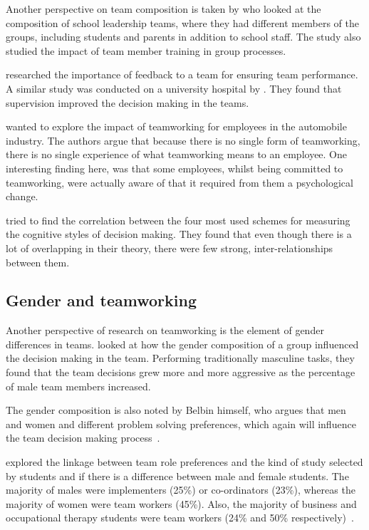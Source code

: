 \documentclass[a4paper,12pt,titlepage]{report}
\begin{document}
  Another perspective on team composition is taken by \citet{jcscjb}
  who looked at the composition of school leadership teams, where they had different
  members of the groups, including students and parents in addition to school staff.
  The study also studied the impact of team member training in group processes.

  \citet{jhdi} researched the importance of feedback to a team for ensuring
  team performance. A similar study was conducted on a university hospital by
  \citet{khka}. They found that supervision improved the decision making in
  the teams.

  \citet{dkdm} wanted to explore the impact of teamworking for employees in
  the automobile industry. The authors argue that because there is no single form of
  teamworking, there is no single experience of what teamworking means to an employee.
  One interesting finding here, was that some employees,
  whilst being committed to teamworking, were actually aware of
  that it required from them a psychological change.

  \citet{nlrskk} tried to find the correlation between the four most used
  schemes for measuring the cognitive styles of decision making. They found that
  even though there is a lot of overlapping in their theory, there were few strong,
  inter-relationships between them.
  
  \subsection{Gender and teamworking}
  Another perspective of research on teamworking is the element of gender
  differences in teams. \citet{jljhdijcae} looked at how the gender composition
  of a group influenced the decision making in the team. Performing traditionally
  masculine tasks, they found that the team decisions grew more and more
  aggressive as the percentage of male team members increased.

  The gender composition is also noted by Belbin himself, who argues
  that men and women and different problem solving preferences, which again
  will influence the team decision making process~\cite[41]{cg2}.

  \citet{jssd} explored the linkage between team role preferences and the kind
  of study selected by students and if there is a difference between male and female
  students. The majority of males were implementers (25\%) or co-ordinators (23\%),
  whereas the majority of women were team workers (45\%). Also, the majority of
  business and occupational therapy students were team workers (24\% and 50\%
  respectively)~\cite[170]{jssd}.
\end{document}
